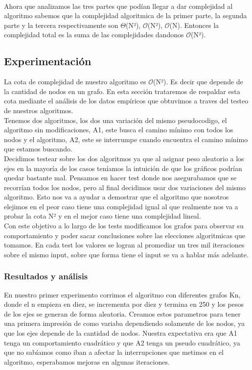 \documentclass[spanish,12pt]{article}
\begin{document}
\\
\tab Ahora que analizamos las tres partes que podían llegar a dar complejidad al algoritmo sabemos que la complejidad algoritmica de la primer parte, la segunda parte y la tercera respectivamente son $\Theta$(N²), $\mathcal{O}$(N²), $\mathcal{O}$(N). Entonces la complejidad total es la suma de las complejidades dandonos $\mathcal{O}$(N²).

\subsection{Experimentación}

La cota de complejidad de nuestro algoritmo es $\mathcal{O}$(N²). Es decir que depende de la cantidad de nodos en un grafo.
En esta sección trataremos de respaldar esta cota mediante el análisis de los datos empíricos que obtuvimos a traves del testeo de nuestros algoritmos.
\\
Tenemos dos algoritmos, los dos una variación del mismo pseudocodigo, el algoritmo sin modificaciones, A1, este busca el camino mínimo con todos los nodos y el algoritmo, A2, este se interrumpe cuando encuentra el camino mínimo que estamos buscando.  
\\
 Decidimos testear sobre los dos algoritmos ya que al asignar peso aleatorio a los ejes en la mayoría de los casos teníamos la intuición de que los gráficos podrían quedar bastante mal. Pensamos en hacer test donde nos asegurabamos que se recorrían todos los nodos, pero al final decidimos usar dos variaciones del mismo algoritmo. Esto nos va a ayudar a demostrar que el algoritmo que nosotros elejimos en el peor caso tiene una complejidad igual al que realmente nos va a probar la cota N² y en el mejor caso tiene una complejidad lineal.
\\  
Con este objetivo a lo largo de los tests modificamos los grafos para observar su comportamiento y poder sacar conclusiones sobre las elecciones algoritmicas que tomamos. En cada test los valores se logran al promediar un tres mil iteraciones sobre el mismo input, sobre que forma tiene el input se va a hablar más adelante.

\subsubsection{Resultados y análisis}

En nuestro primer experimento corrimos el algoritmo con diferentes grafos Kn, donde el n empieza en diez, se incrementa por diez y termina en 250 y los pesos de los ejes se generan de forma aleatoria. Creamos estos parametros para tener una primera impresión de como variaba dependiendo solamente de los nodos, ya que los ejes depende de la cantidad de nodos. Nuestra expectativa era que A1 tenga un comportamiento cuadrático y que A2 tenga un pseudo cuadrático, ya que no sabíamos como iban a afectar la interrupciones que metimos en el algoritmo, esperabamos mejoras en algunas iteraciones.
\end{document}

